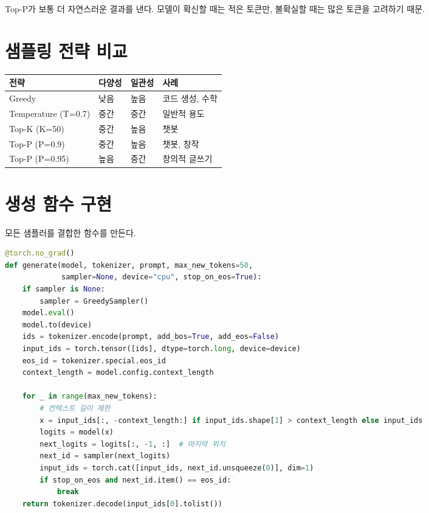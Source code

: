 Top-P가 보통 더 자연스러운 결과를 낸다. 모델이 확신할 때는 적은 토큰만, 불확실할 때는 많은 토큰을 고려하기 때문.

\section{샘플링 전략 비교}

\begin{center}
\begin{tabularx}{\textwidth}{lXXX}
\toprule
\textbf{전략} & \textbf{다양성} & \textbf{일관성} & \textbf{사례} \\
\midrule
Greedy & 낮음 & 높음 & 코드 생성, 수학 \\
Temperature (T=0.7) & 중간 & 중간 & 일반적 용도 \\
Top-K (K=50) & 중간 & 높음 & 챗봇 \\
Top-P (P=0.9) & 중간 & 높음 & 챗봇, 창작 \\
Top-P (P=0.95) & 높음 & 중간 & 창의적 글쓰기 \\
\bottomrule
\end{tabularx}
\end{center}

\section{생성 함수 구현}

모든 샘플러를 결합한  함수를 만든다.

\begin{lstlisting}[language=Python]
@torch.no_grad()
def generate(model, tokenizer, prompt, max_new_tokens=50,
             sampler=None, device="cpu", stop_on_eos=True):
    if sampler is None:
        sampler = GreedySampler()
    model.eval()
    model.to(device)
    ids = tokenizer.encode(prompt, add_bos=True, add_eos=False)
    input_ids = torch.tensor([ids], dtype=torch.long, device=device)
    eos_id = tokenizer.special.eos_id
    context_length = model.config.context_length

    for _ in range(max_new_tokens):
        # 컨텍스트 길이 제한
        x = input_ids[:, -context_length:] if input_ids.shape[1] > context_length else input_ids
        logits = model(x)
        next_logits = logits[:, -1, :]  # 마지막 위치
        next_id = sampler(next_logits)
        input_ids = torch.cat([input_ids, next_id.unsqueeze(0)], dim=1)
        if stop_on_eos and next_id.item() == eos_id:
            break
    return tokenizer.decode(input_ids[0].tolist())
\end{lstlisting}

